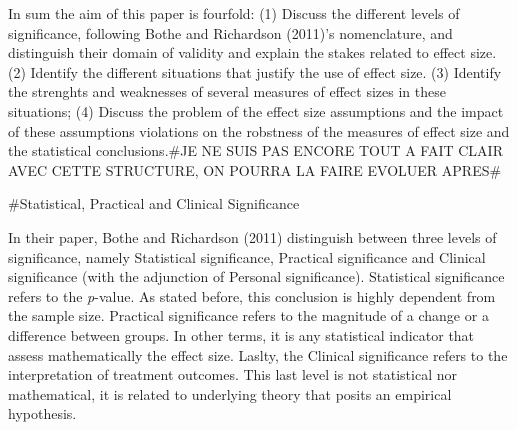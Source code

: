 \documentclass[man]{apa6}
\begin{document}
In sum the aim of this paper is fourfold: (1) Discuss the different levels of significance, following Bothe and Richardson (2011)'s nomenclature, and distinguish their domain of validity and explain the stakes related to effect size.(2) Identify the different situations that justify the use of effect size.
(3) Identify the strenghts and weaknesses of several measures of effect sizes in these situations; (4) Discuss the problem of the effect size assumptions and the impact of these assumptions violations on the robstness of the measures of effect size and the statistical conclusions.\#JE NE SUIS PAS ENCORE TOUT A FAIT CLAIR AVEC CETTE STRUCTURE, ON POURRA LA FAIRE EVOLUER APRES\#

\#Statistical, Practical and Clinical Significance

In their paper, Bothe and Richardson (2011) distinguish between three levels of significance, namely Statistical significance, Practical significance and Clinical significance (with the adjunction of Personal significance). Statistical significance refers to the \emph{p}-value. As stated before, this conclusion is highly dependent from the sample size. Practical significance refers to the magnitude of a change or a difference between groups. In other terms, it is any statistical indicator that assess mathematically the effect size. Laslty, the Clinical significance refers to the interpretation of treatment outcomes. This last level is not statistical nor mathematical, it is related to underlying theory that posits an empirical hypothesis.
\end{document}
